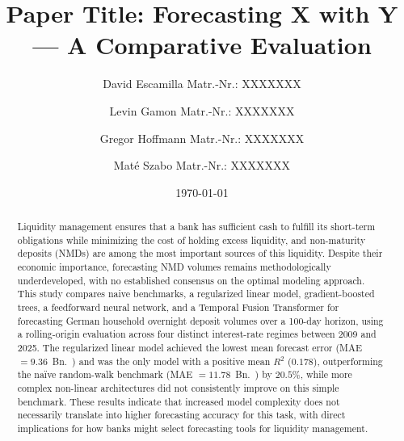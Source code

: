 \documentclass[11pt,a4paper]{article}
\title{\textbf{Paper Title: Forecasting X with Y --- A Comparative Evaluation}}
\author[1]{David Escamilla \small Matr.-Nr.: XXXXXXX}
\author[1]{Levin Gamon \small Matr.-Nr.: XXXXXXX}
\author[1]{Gregor Hoffmann \small Matr.-Nr.: XXXXXXX}
\author[1]{Maté Szabo \small Matr.-Nr.: XXXXXXX}
\affil[1]{LMU Munich School of Management, Institute of AI in Management}
\date{\today}
\begin{document}
\maketitle

\begin{abstract}
    \noindent Liquidity management ensures that a bank has sufficient
    cash to fulfill its short-term obligations while minimizing the
    cost of holding excess liquidity, and non-maturity deposits (NMDs)
    are among the most important sources of this liquidity. Despite
    their economic importance, forecasting NMD volumes remains
    methodologically underdeveloped, with no established consensus on
    the optimal modeling approach. This study compares naive
    benchmarks, a regularized linear model, gradient-boosted trees, a
    feedforward neural network, and a Temporal Fusion Transformer for
    forecasting German household overnight deposit volumes over a
    100-day horizon, using a rolling-origin evaluation across four
    distinct interest-rate regimes between 2009 and 2025. The
    regularized linear model achieved the lowest mean forecast error
    (MAE $= 9.36$~Bn.~\texteuro) and was the only model with a
    positive mean $R^2$ ($0.178$), outperforming the na\"ive
    random-walk benchmark (MAE $= 11.78$~Bn.~\texteuro) by
    $20.5\%$, while more complex non-linear architectures did not
    consistently improve on this simple benchmark. These results
    indicate that increased model complexity does not necessarily
    translate into higher forecasting accuracy for this task, with
    direct implications for how banks might select forecasting tools
    for liquidity management.
    \end{abstract}

\newpage
\tableofcontents
\newpage

\end{document}
